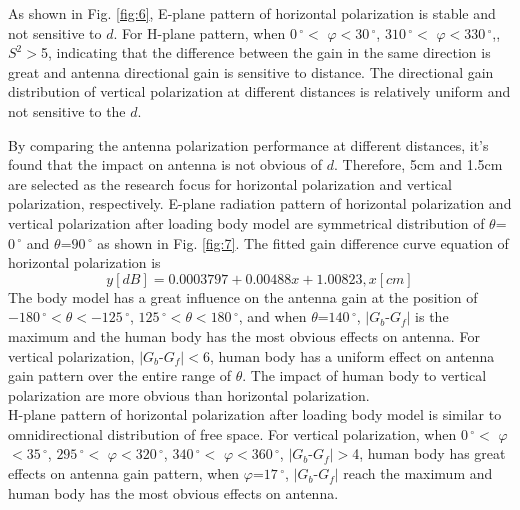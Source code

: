 \documentclass[journal]{IEEEtran}
\begin{document}
As shown in Fig. \ref{fig:6}, E-plane pattern of horizontal polarization is stable and not sensitive to $d$. For H-plane pattern, when
$0\,^{\circ}$$<$ $\varphi$$<$$30\,^{\circ}$, $310\,^{\circ}$$<$ $\varphi$$<$$330\,^{\circ}$,,
$S^{2}$$>$5, indicating that the difference between the gain in the same direction is great and antenna directional
gain is sensitive to distance. The directional gain distribution of vertical polarization at different distances is relatively
uniform and not sensitive to the $d$.

By comparing the antenna polarization performance at different distances, it’s found that the impact on antenna is not obvious
of $d$. Therefore, 5cm and 1.5cm are selected as the research focus for horizontal polarization and vertical
polarization, respectively.
E-plane radiation pattern of horizontal polarization and vertical polarization after loading body model are symmetrical
distribution of $\theta$=$0\,^{\circ}$ and $\theta$=$90\,^{\circ}$ as shown in Fig. \ref{fig:7}. The fitted gain difference curve equation of horizontal
polarization is
\begin{equation}
\label{eq:eps_2}
y[dB]=0.0003797+0.00488x+1.00823,  x[cm]
\end{equation}
The  body model has a great influence on the antenna gain at the position of
$-180\,^{\circ}$$<$$\theta$$<$$-125\,^{\circ}$, $125\,^{\circ}$$<$$\theta$$<$$180\,^{\circ}$, and
when $\theta$=$140\,^{\circ}$, $\mid$$G_{b}$-$G_{f}$$\mid$ is the maximum and the human body has the most obvious effects on
antenna. For vertical polarization, $\mid$$G_{b}$-$G_{f}$$\mid$$<$6, human body has a uniform effect on antenna gain
pattern over the entire range of $\theta$. The impact of human body to vertical polarization are more obvious than
horizontal polarization.\\
H-plane pattern of horizontal polarization after loading body model is similar to omnidirectional distribution of free space.
For vertical polarization, when $0\,^{\circ}$$<$ $\varphi$$<$$35\,^{\circ}$,
$295\,^{\circ}$$<$ $\varphi$$<$$320\,^{\circ}$, $340\,^{\circ}$$<$ $\varphi$$<$$360\,^{\circ}$,
$\mid$$G_{b}$-$G_{f}$$\mid$$>$4, human body has great effects on antenna gain pattern, when $\varphi$=$17\,^{\circ}$,
$\mid$$G_{b}$-$G_{f}$$\mid$ reach the maximum and human body has the most obvious effects on antenna.
\end{document}
